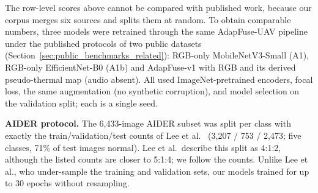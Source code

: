 The row-level scores above cannot be compared with published work, because our corpus merges six sources and splits them at random. To obtain comparable numbers, three models were retrained through the same AdapFuse-UAV pipeline under the published protocols of two public datasets (Section~\ref{sec:public_benchmarks_related}): RGB-only MobileNetV3-Small (A1), RGB-only EfficientNet-B0 (A1b) and AdapFuse-v1 with RGB and its derived pseudo-thermal map (audio absent). All used ImageNet-pretrained encoders, focal loss, the same augmentation (no synthetic corruption), and model selection on the validation split; each is a single seed.

\textbf{AIDER protocol.} The 6{,}433-image AIDER subset was split per class with exactly the train/validation/test counts of Lee et al.~\cite{lee2023wattefnet} (3{,}207 / 753 / 2{,}473; five classes, 71\% of test images normal). Lee et al.\ describe this split as 4:1:2, although the listed counts are closer to 5:1:4; we follow the counts. Unlike Lee et al., who under-sample the training and validation sets, our models trained for up to 30 epochs without resampling.

